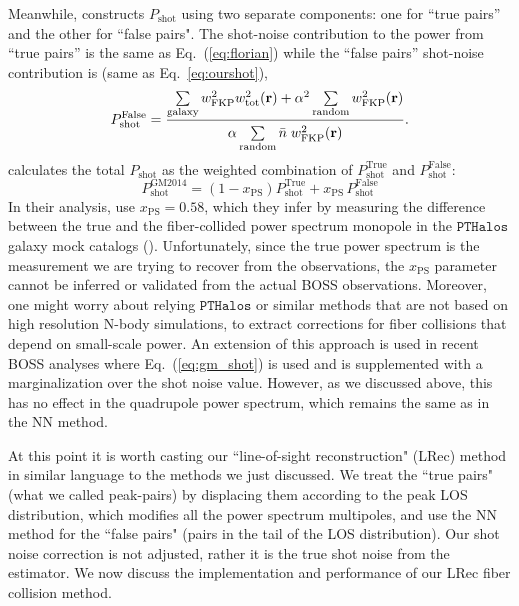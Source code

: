 Meanwhile, \cite{Gil-Marin:2014aa} constructs $P_\mathrm{shot}$ using two separate 
components: one for ``true pairs'' and the other for ``false pairs". 
The shot-noise contribution to the power from ``true pairs'' is the same as 
Eq.~(\ref{eq:florian}) while the ``false pairs'' shot-noise contribution is 
(same as Eq.~\ref{eq:ourshot}), 
\begin{equation} \label{eq:gm_falsepairs}
P^\mathrm{False}_\mathrm{shot} = \frac{\sum\limits_{\mathrm{galaxy}} w^2_\mathrm{FKP}w^2_\mathrm{tot}({\bf r}) + 
\alpha^2 \sum\limits_{\mathrm{random}} w_\mathrm{FKP}^2({\bf r})}
{\alpha \sum\limits^{ }_{\mathrm{random}} \bar{n} \; w_\mathrm{FKP}^2({\bf r})}.
\end{equation}
\cite{Gil-Marin:2014aa} calculates the total $P_\mathrm{shot}$ as the 
weighted combination of $P^\mathrm{True}_\mathrm{shot}$ and
$P^\mathrm{False}_\mathrm{shot}$: 
\begin{equation} \label{eq:gm_shot}
P^\mathrm{GM2014}_\mathrm{shot} = (1- x_\mathrm{PS}) P^\mathrm{True}_\mathrm{shot} +
x_\mathrm{PS}\, P^\mathrm{False}_\mathrm{shot}
\end{equation}
In their analysis, \cite{Gil-Marin:2014aa} use $x_\mathrm{PS} = 0.58$, 
which they infer by measuring the difference between 
the true and the fiber-collided power spectrum monopole in the $\mathtt{PTHalos}$ 
galaxy mock catalogs (\citealt{Manera:2013aa}). Unfortunately, since the true 
power spectrum is the measurement we are trying to recover from the observations, the 
$x_\mathrm{PS}$ parameter cannot be inferred or validated from the actual 
BOSS observations. Moreover, one might worry about relying $\mathtt{PTHalos}$ or similar methods that are not based on 
high resolution N-body simulations, to extract corrections for fiber collisions that depend on small-scale power. An extension of this approach is used in recent BOSS analyses  \citep{Beutler:2016aa,Grieb:2016aa,Gil-Marin:2016aa} where Eq.~(\ref{eq:gm_shot}) is used and is supplemented with a marginalization over the shot noise value. However, as we discussed above, this has no effect in the quadrupole power spectrum, which remains the same as in the NN method.

At this point it is worth casting our ``line-of-sight reconstruction" (LRec) 
method in similar language to the methods we just discussed. We treat the 
``true pairs" (what we called peak-pairs) by displacing them according to 
the peak LOS distribution, which modifies all the power spectrum multipoles, 
and use the NN method for the ``false pairs" (pairs in the tail of the LOS 
distribution). Our shot noise correction is not adjusted, rather it is the 
true shot noise from the estimator. 
We now discuss the implementation and performance of our  LRec fiber collision method. 


